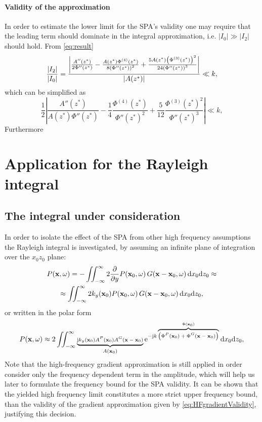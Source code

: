 \documentclass[11pt]{article}
\begin{document}
\paragraph{Validity of the approximation}
In order to estimate the lower limit for the SPA's validity one may require that the leading term should dominate in the integral approximation, i.e. $|I_0| \gg |I_2|$ should hold.
From \eqref{eq:result}
\begin{equation}
    \scriptsize
    \frac{|I_2|}{|I_0|} =
    \frac{\left| \frac{A''(z^*)}{2\Phi''(z^*)}
    -\frac{A(z^*)\Phi^{(4)}(z^*)}{8\left(\Phi''(z^*)\right)^2}+\frac{5A(z^*)\bigl(\Phi^{(3)}(z^*)\bigr)^2}
    {24\left(\Phi''(z^*)\right)^3}\right|}
    {|A(z^*)|}
    \ll k,
\end{equation}
which can be simplified as
\begin{equation}
    \frac{1}{2}
    \left| \frac{A''(z^*)}{A(z^*) \Phi''(z^*)}
    -\frac{1}{4}\frac{\Phi^{(4)}(z^*)}{\Phi''(z^*)^2}+\frac{5}{12}\frac{\Phi^{(3)}(z^*)^2}
    {\Phi''(z^*)^3}\right|
    \ll k,
            \label{eq:SPAvalidity}
\end{equation}
Furthermore 

\section{Application for the Rayleigh integral}

\subsection{The integral under consideration}
In order to isolate the effect of the SPA from other high frequency assumptions the Rayleigh integral is investigated, by assuming an infinite plane of integration over the $x_0z_0$ plane:
\begin{multline}
    P(\mathbf{x},\omega) = - \iint_{-\infty}^{\infty}  2 \frac{\partial}{\partial y} P(\mathbf{x}_0,\omega) \, G(\mathbf{x}-\mathbf{x}_0,\omega) \, \mathrm{d} x_0 \mathrm{d} z_0 \approx
    \\ \approx \iint_{-\infty}^{\infty}  2 k_y(\mathbf{x}_0) P(\mathbf{x}_0,\omega) \, G(\mathbf{x}-\mathbf{x}_0,\omega) \, \mathrm{d} x_0 \mathrm{d} z_0,
    \label{eq:Rayleigh}
\end{multline}
or written in the polar form
\begin{multline}
    \scriptsize
    P(\mathbf{x},\omega) \approx 2 \iint_{-\infty}^{\infty}  \underbrace{ \mathrm{j} k_y(\mathbf{x}_0) A^P(\mathbf{x}_0) A^G(\mathbf{x}-\mathbf{x}_0)}_{A(\mathbf{x}_0)} 
    \mathrm{e}^{-\mathrm{j} k \overbrace{ \left( \Phi^P(\mathbf{x}_0) + \Phi^G(\mathbf{x}-\mathbf{x}_0)\right)}^{\Phi(\mathbf{x}_0)} } \, \mathrm{d} x_0 \mathrm{d} z_0,
    \label{eq:RayleighPolar}
\end{multline}
Note that the high-frequency gradient approximation is still applied in order consider only the frequency dependent term in the amplitude, which will help us later to formulate the frequency bound for the SPA validity.
It can be shown that the yielded high frequency limit constitutes a more strict upper frequency bound, than the validity of the gradient approximation given by \eqref{eq:HFgradientValidity}, justifying this decision.
\end{document}
